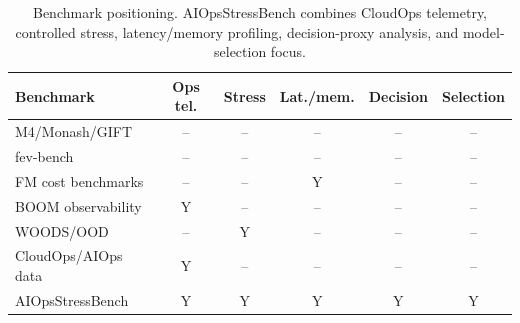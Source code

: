 \begin{table}[t]
\centering
\caption{Benchmark positioning. AIOpsStressBench combines CloudOps telemetry, controlled stress, latency/memory profiling, decision-proxy analysis, and model-selection focus.}
\label{tab:benchmark-positioning}
\scriptsize
\setlength{\tabcolsep}{2.7pt}
\begin{tabular}{l c c c c c}
\toprule
Benchmark & Ops tel. & Stress & Lat./mem. & Decision & Selection \\
\midrule
M4/Monash/GIFT & -- & -- & -- & -- & -- \\
fev-bench & -- & -- & -- & -- & -- \\
FM cost benchmarks & -- & -- & Y & -- & -- \\
BOOM observability & Y & -- & -- & -- & -- \\
WOODS/OOD & -- & Y & -- & -- & -- \\
CloudOps/AIOps data & Y & -- & -- & -- & -- \\
AIOpsStressBench & Y & Y & Y & Y & Y \\
\bottomrule
\end{tabular}
\end{table}
